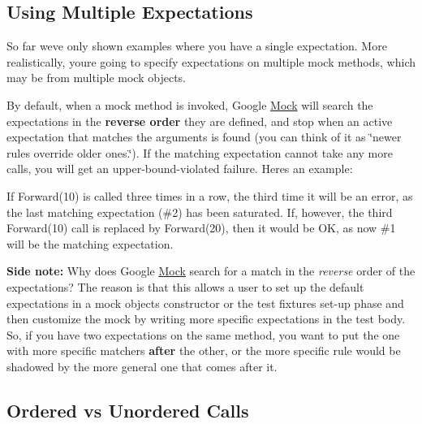 \subsection*{Using Multiple Expectations}

So far we\textquotesingle{}ve only shown examples where you have a single expectation. More realistically, you\textquotesingle{}re going to specify expectations on multiple mock methods, which may be from multiple mock objects.

By default, when a mock method is invoked, Google \mbox{\hyperlink{class_mock}{Mock}} will search the expectations in the {\bfseries{reverse order}} they are defined, and stop when an active expectation that matches the arguments is found (you can think of it as \char`\"{}newer rules override older ones.\char`\"{}). If the matching expectation cannot take any more calls, you will get an upper-\/bound-\/violated failure. Here\textquotesingle{}s an example\+:


\begin{DoxyCode}{0}
\end{DoxyCode}


If {\ttfamily Forward(10)} is called three times in a row, the third time it will be an error, as the last matching expectation (\#2) has been saturated. If, however, the third {\ttfamily Forward(10)} call is replaced by {\ttfamily Forward(20)}, then it would be OK, as now \#1 will be the matching expectation.

{\bfseries{Side note\+:}} Why does Google \mbox{\hyperlink{class_mock}{Mock}} search for a match in the {\itshape reverse} order of the expectations? The reason is that this allows a user to set up the default expectations in a mock object\textquotesingle{}s constructor or the test fixture\textquotesingle{}s set-\/up phase and then customize the mock by writing more specific expectations in the test body. So, if you have two expectations on the same method, you want to put the one with more specific matchers {\bfseries{after}} the other, or the more specific rule would be shadowed by the more general one that comes after it.

\subsection*{Ordered vs Unordered Calls}

